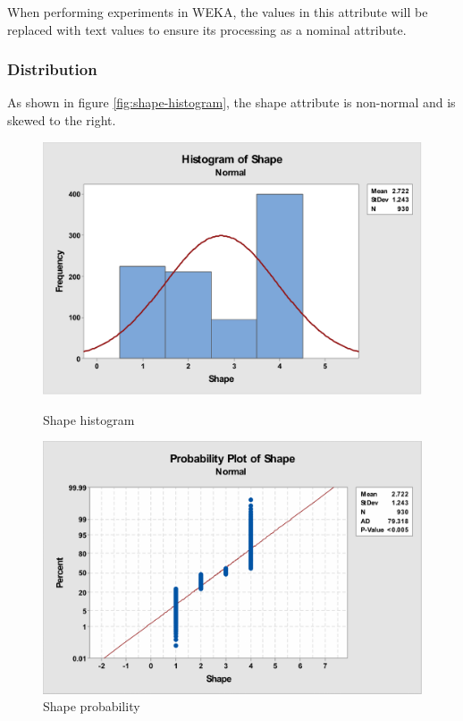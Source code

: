 \documentclass[12pt]{article}
\begin{document}
        When performing experiments in WEKA, the values in this attribute will be replaced with text values to ensure its processing as a nominal attribute.

      \subsubsection{Distribution}
        As shown in figure \ref{fig:shape-histogram}, the shape attribute is non-normal and is skewed to the right.

        \begin{figure}[H]
          \centering
          \begin{minipage}[b]{0.45\textwidth}
            \includegraphics[width=\textwidth]{shape-histogram}
            \caption{Shape histogram}
            \label{fig:shape-histogram}
          \end{minipage}
          \hfill
          \begin{minipage}[b]{0.45\textwidth}
            \includegraphics[width=\textwidth]{shape-probability}
            \caption{Shape probability}
            \label{fig:shape-probability}
          \end{minipage}
        \end{figure}
\end{document}
